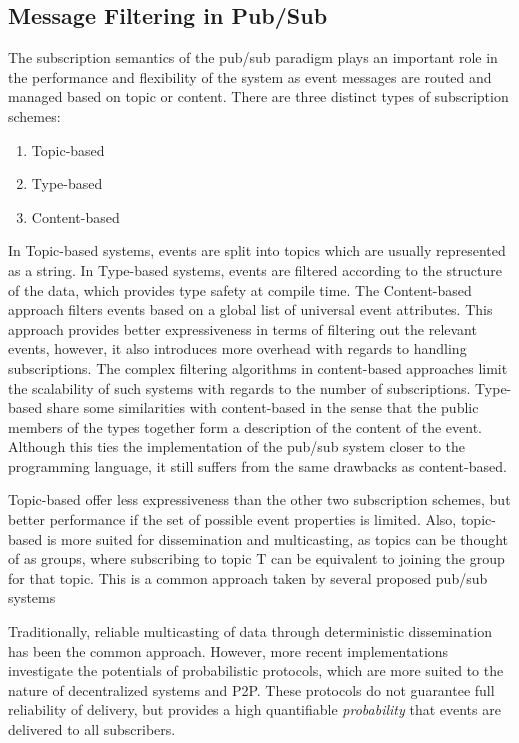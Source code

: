 \subsection{Message Filtering in Pub/Sub}

The subscription semantics of the pub/sub paradigm plays an important
role in the performance and flexibility of the system as event messages
are routed and managed based on topic or content. There are three
distinct types of subscription schemes:

\begin{enumerate}
    \item Topic-based
    \item Type-based
    \item Content-based
\end{enumerate}

In Topic-based systems, events are split into topics which are usually
represented as a string. In Type-based systems, events are filtered
according to the structure of the data, which provides type safety at
compile time. The  Content-based approach filters events based on a
global list of universal event attributes. This approach provides better
expressiveness in terms of filtering out the relevant events, however,
it also introduces more overhead with regards to handling
subscriptions. The complex filtering algorithms in content-based
approaches limit the scalability of
such systems with regards to the number of subscriptions. Type-based
share some similarities with content-based in the sense that the public members of the
types together form a description of the content of the event. Although
this ties the implementation of the pub/sub system closer to the
programming language, it still suffers from the same drawbacks as
content-based.

Topic-based offer less expressiveness than the other two subscription
schemes, but better performance if the set of possible event properties
is limited. Also, topic-based is more suited for dissemination and
multicasting, as topics can be thought of as groups, where subscribing
to topic T can be equivalent to joining the group for that topic. This
is a common approach taken by several proposed pub/sub
systems~\cite{Setty:2012, Castro:2002, Rahimian:2011, Wong:2008,
    Girdzijauskas:2010}

Traditionally, reliable multicasting of data through deterministic
dissemination has been the common approach. However, more recent
implementations investigate the potentials of probabilistic protocols,
which are more suited to the nature of decentralized systems and P2P.
These protocols do not guarantee full reliability of delivery, but provides a high
quantifiable \emph{probability} that events are delivered to all
subscribers.

